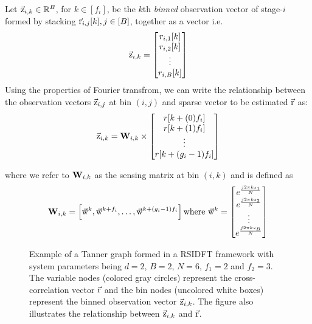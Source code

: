 	 Let $\vec{\mathrm{z}}_{i,k}\in\mathbb{R}^{B}$, for $k\in [f_i]$, be the $k$th \textit{binned} observation vector of stage-$i$ formed by stacking $\vec{\mathrm{r}}_{i,j}[k], j\in[B]$, together as a vector i.e.
\[
	  \vec{\mathrm{z}}_{i,k} = \begin{bmatrix}
	 r_{i,1}[k] \\
	 r_{i,2}[k] \\
	 \vdots\\
	 r_{i,B}[k]
	 \end{bmatrix}
\]
Using the properties of Fourier transfrom, we can write the relationship between the observation vectors $\vec{\mathrm{z}}_{i,j}$ at bin $(i,j)$ and sparse vector to be estimated $\vec{\mathrm{r}}$ as:
\begin{align}
	\label{Eqn:Generator Equation}
	\vec{\mathrm{z}}_{i,k}= \mathbf{W}_{i,k} \times
	\begin{bmatrix}
		r[k+(0)f_i] \\
		r[k+(1)f_i] \\
		\vdots\\
		r[k+(g_i-1)f_i]
	\end{bmatrix}
\end{align}

where we refer to $\mathbf{W}_{i,k}$ as the sensing matrix at bin $(i,k)$ and is defined as
\begin{align}\label{Eqn:Sensing Matrix}
	\mathbf{W}_{i,k} = \left[\vec{\mathrm{w}}^{k},\vec{\mathrm{w}}^{k+f_i},\ldots, \vec{\mathrm{w}}^{k+(g_i-1)f_i}\right] \text{where} ~\vec{\mathrm{w}}^{k}=
	\begin{bmatrix}
		e^{\frac{j2\pi ks_1}{N}}\\
		e^{\frac{j2\pi ks_2}{N}}\\
		\vdots\\
		e^{\frac{j2\pi ks_B}{N}}
	\end{bmatrix}
\end{align}

\begin{figure}[h!]
	\begin{center}
	 	\resizebox{0.45\textwidth}{!}{}	
	\end{center}	
	\caption{Example of a Tanner graph formed in a RSIDFT framework with system parameters being $d=2$, $B=2$, $N=6$, $f_1 = 2$ and $f_2=3$. The variable nodes (colored gray circles) represent the cross-correlation vector $\vec{\mathrm{r}}$ and the bin nodes (uncolored white boxes) represent the binned observation vector $\vec{\mathrm{z}}_{i,k}$. The figure also illustrates the relationship between $\vec{\mathrm{z}}_{i,k}$ and $\vec{\mathrm{r}}$.}\label{fig:factorgraph}
	\vspace{5 pt}
\end{figure}

